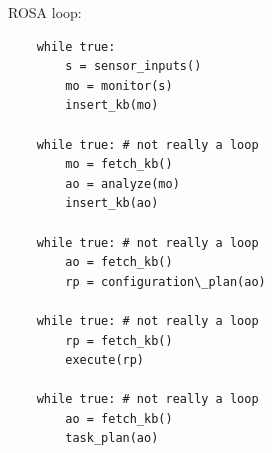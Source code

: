 ROSA loop:
\begin{lstlisting}
    while true:
        s = sensor_inputs()
        mo = monitor(s)
        insert_kb(mo)

    while true: # not really a loop
        mo = fetch_kb()
        ao = analyze(mo)
        insert_kb(ao)
    
    while true: # not really a loop
        ao = fetch_kb()
        rp = configuration\_plan(ao)

    while true: # not really a loop
        rp = fetch_kb()
        execute(rp)

    while true: # not really a loop
        ao = fetch_kb()
        task_plan(ao)

\end{lstlisting}